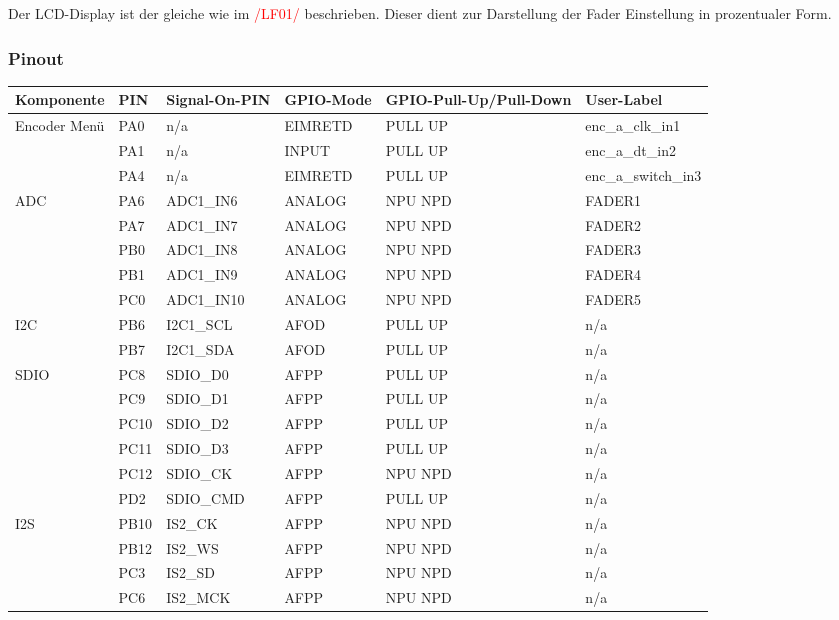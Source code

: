 Der LCD-Display ist der gleiche wie im \textcolor{red}{/LF01/} beschrieben. Dieser dient zur Darstellung der Fader Einstellung in prozentualer Form.

\newpage

\subsubsection{Pinout}
\begin{longtable}[c]{|p{2.5cm}|p{1cm}|p{2.5cm}|p{2.5cm}|p{2.5cm}|p{3cm}|}
	\hline
	\textbf{Komponente} & \textbf{PIN} & \textbf{Signal-On-PIN} &  \textbf{GPIO-Mode} & \textbf{GPIO-Pull-Up/Pull-Down } & \textbf{User-Label}\\
	\hline
	Encoder Menü & PA0 & n/a & EIMRETD & PULL UP & enc\_a\_clk\_in1 \\
	\hline
	& PA1 & n/a &  INPUT & PULL UP & enc\_a\_dt\_in2 \\
	\hline
	& PA4 & n/a & EIMRETD & PULL UP & enc\_a\_switch\_in3 \\
	\hline
	ADC & PA6 & ADC1\_IN6 & ANALOG & NPU NPD & FADER1 \\
	\hline
	& PA7 & ADC1\_IN7 & ANALOG & NPU NPD & FADER2 \\
	\hline
	& PB0 & ADC1\_IN8 & ANALOG & NPU NPD & FADER3 \\
	\hline
	& PB1 & ADC1\_IN9 & ANALOG & NPU NPD & FADER4 \\
	\hline
	& PC0 & ADC1\_IN10 & ANALOG & NPU NPD & FADER5 \\	
	\hline
	I2C & PB6 &I2C1\_SCL & AFOD & PULL UP & n/a \\
	\hline
	& PB7 &I2C1\_SDA & AFOD & PULL UP & n/a \\
	\hline
	SDIO & PC8 & SDIO\_D0 & AFPP & PULL UP & n/a \\
	\hline
	& PC9 & SDIO\_D1 & AFPP & PULL UP & n/a \\
	\hline
	& PC10 & SDIO\_D2 & AFPP & PULL UP & n/a \\
	\hline
	& PC11 & SDIO\_D3 & AFPP & PULL UP & n/a \\
	\hline
	& PC12 & SDIO\_CK & AFPP & NPU NPD & n/a \\
	\hline
	& PD2 & SDIO\_CMD & AFPP & PULL UP & n/a \\
	\hline
	I2S & PB10 & IS2\_CK & AFPP  & NPU NPD & n/a \\
	\hline
	& PB12 & IS2\_WS & AFPP & NPU NPD & n/a \\
	\hline
	& PC3 & IS2\_SD & AFPP & NPU NPD &  n/a \\
	\hline
	& PC6 & IS2\_MCK & AFPP & NPU NPD &  n/a \\
	\hline
\end{longtable}

